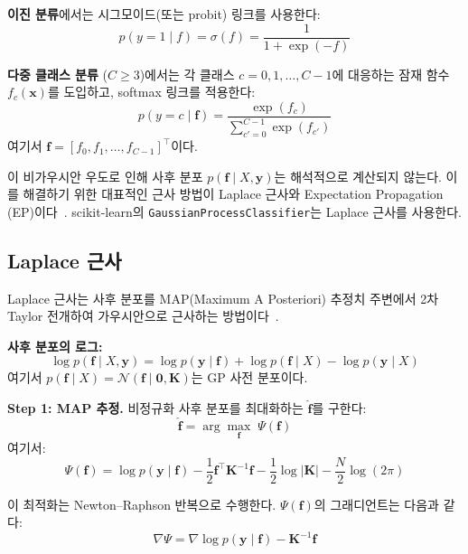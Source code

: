 \documentclass[11pt]{article}
\begin{document}
\textbf{이진 분류}에서는 시그모이드(또는 probit) 링크를 사용한다:
\begin{equation}
p(y = 1 \mid f) = \sigma(f) = \frac{1}{1 + \exp(-f)}
\label{eq:sigmoid}
\end{equation}

\textbf{다중 클래스 분류} ($C \geq 3$)에서는 각 클래스 $c = 0, 1, \dots, C-1$에 대응하는
잠재 함수 $f_c(\mathbf{x})$를 도입하고, softmax 링크를 적용한다:
\begin{equation}
p(y = c \mid \mathbf{f}) = \frac{\exp(f_c)}{\sum_{c'=0}^{C-1} \exp(f_{c'})}
\label{eq:softmax}
\end{equation}
여기서 $\mathbf{f} = [f_0, f_1, \dots, f_{C-1}]^\top$이다.

이 비가우시안 우도로 인해 사후 분포 $p(\mathbf{f} \mid X, \mathbf{y})$는 해석적으로 계산되지 않는다.
이를 해결하기 위한 대표적인 근사 방법이 Laplace 근사와 Expectation Propagation (EP)이다~\cite{Nickisch2008}.
scikit-learn의 \texttt{GaussianProcessClassifier}는 Laplace 근사를 사용한다.


\subsection{Laplace 근사}

Laplace 근사는 사후 분포를 MAP(Maximum A Posteriori) 추정치 주변에서
2차 Taylor 전개하여 가우시안으로 근사하는 방법이다~\cite{MacKay1992}.

\textbf{사후 분포의 로그:}
\begin{equation}
\log p(\mathbf{f} \mid X, \mathbf{y}) = \log p(\mathbf{y} \mid \mathbf{f}) + \log p(\mathbf{f} \mid X) - \log p(\mathbf{y} \mid X)
\label{eq:log_posterior}
\end{equation}
여기서 $p(\mathbf{f} \mid X) = \mathcal{N}(\mathbf{f} \mid \mathbf{0}, \mathbf{K})$는 GP 사전 분포이다.

\textbf{Step 1: MAP 추정.}
비정규화 사후 분포를 최대화하는 $\hat{\mathbf{f}}$를 구한다:
\[
\hat{\mathbf{f}} = \arg\max_{\mathbf{f}} \; \Psi(\mathbf{f})
\]
여기서:
\begin{equation}
\Psi(\mathbf{f}) = \log p(\mathbf{y} \mid \mathbf{f}) - \frac{1}{2} \mathbf{f}^\top \mathbf{K}^{-1} \mathbf{f} - \frac{1}{2} \log |\mathbf{K}| - \frac{N}{2} \log(2\pi)
\label{eq:psi}
\end{equation}

이 최적화는 Newton--Raphson 반복으로 수행한다. $\Psi(\mathbf{f})$의 그래디언트는 다음과 같다:
\[
\nabla \Psi = \nabla \log p(\mathbf{y} \mid \mathbf{f}) - \mathbf{K}^{-1} \mathbf{f}
\]
\end{document}
